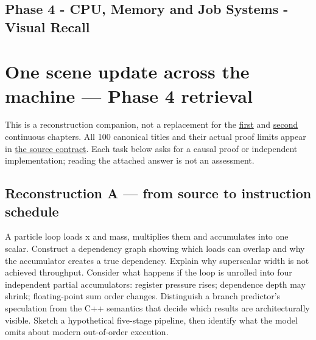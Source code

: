 \hypertarget{appendix-2587680a4fe3}{}
\section*{Phase 4 - CPU, Memory and Job Systems - Visual Recall}
\chapter{One scene update across the machine --- Phase 4 retrieval}\label{appendix-2587680a4fe3-one-scene-update-across-the-machine-phase-4-retrieval}

This is a reconstruction companion, not a replacement for the \href{Continuous\%20Notes/Computing\%20Foundations\%20-\%20From\%20Bits\%20to\%20C++\%20and\%20Systems\%20APIs\#From\%20a\%20correct\%20C++\%20asset\%20service\%20to\%20the\%20instructions\%20a\%20CPU\%20can\%20execute\%20—\%20Phase\%204,\%20M019–M021,\%20Parts\%20301–346}{first} and \href{Continuous\%20Notes/Computing\%20Foundations\%20-\%20From\%20Bits\%20to\%20C++\%20and\%20Systems\%20APIs\#From\%20temporary\%20memory\%20to\%20finished\%20parallel\%20frames\%20—\%20Phase\%204,\%20M022–M024,\%20Parts\%20347–400}{second} continuous chapters. All 100 canonical titles and their actual proof limits appear in \hyperref[appendix-fd090d982a15-phase-4-cpu-architecture-and-measured-execution-parts-301400]{the source contract}. Each task below asks for a causal proof or independent implementation; reading the attached answer is not an assessment.

\section{Reconstruction A --- from source to instruction schedule}\label{appendix-2587680a4fe3-reconstruction-a-from-source-to-instruction-schedule}

A particle loop loads x and mass, multiplies them and accumulates into one scalar. Construct a dependency graph showing which loads can overlap and why the accumulator creates a true dependency. Explain why superscalar width is not achieved throughput. Consider what happens if the loop is unrolled into four independent partial accumulators: register pressure rises; dependence depth may shrink; floating-point sum order changes. Distinguish a branch predictor's speculation from the C++ semantics that decide which results are architecturally visible. Sketch a hypothetical five-stage pipeline, then identify what the model omits about modern out-of-order execution.

